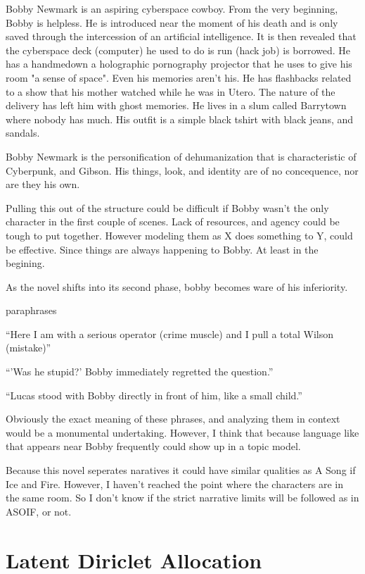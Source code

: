 \documentclass{report}\usepackage[]{graphicx}\usepackage[]{color}
\begin{document}
{Bobby Newmark is an aspiring cyberspace cowboy. From the very beginning, Bobby is helpless. He is introduced near the moment of his death and is only saved through the intercession of an artificial intelligence. It is then revealed that the cyberspace deck (computer) he used to do is run (hack job) is borrowed. He has a handmedown a holographic pornography projector that he uses to give his room "a sense of space". Even his memories aren't his. He has flashbacks related to a show that his mother watched while he was in Utero. The nature of the delivery has left him with ghost memories. He lives in a slum called Barrytown where nobody has much. His outfit is a simple black tshirt with black jeans, and sandals.

Bobby Newmark is the personification of dehumanization that is characteristic of Cyberpunk, and Gibson. His things, look, and identity are of no concequence, nor are they his own.

Pulling this out of the structure could be difficult if Bobby wasn't the only character in the first couple of scenes. Lack of resources, and agency could be tough to put together. However modeling them as X does something to Y, could be effective. Since things are always happening to Bobby. At least in the begining. 

\date{February 5, 2014}
As the novel shifts into its second phase, bobby becomes ware of his inferiority.

paraphrases
\item
  ``Here I am with a serious operator (crime muscle) and I pull a total Wilson (mistake)''
\item
  ``'Was he stupid?' Bobby immediately regretted the question.''
\item
  ``Lucas stood with Bobby directly in front of him, like a small child.''

Obviously the exact meaning of these phrases, and analyzing them in context would be a monumental undertaking. However, I think that because language like that appears near Bobby frequently could show up in a topic model. 

Because this novel seperates naratives it could have similar qualities as A Song if Ice and Fire. However, I haven't reached the point where the characters are in the same room. So I don't know if the strict narrative limits will be followed as in ASOIF, or not.

\section{Latent Diriclet Allocation}
\date{February 5, 2014}

}
\end{document}
